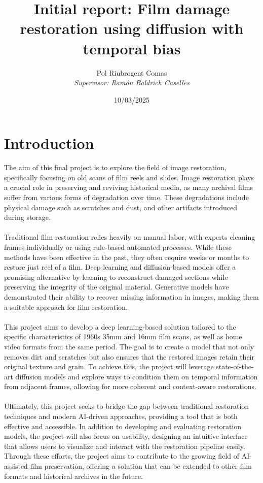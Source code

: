 \documentclass[openany, 12pt]{article}
\begin{document}
	\pagestyle{plain}
	\author{Pol Riubrogent Comas\\ \textit{Supervisor: Ramón Baldrich Caselles}}
	\title{\textbf{Initial report: Film damage restoration using diffusion with temporal bias}}
	\date{\small 10/03/2025}
	\maketitle
	\section{Introduction}
The aim of this final project is to explore the field of image restoration, specifically focusing on old scans of film reels and slides. Image restoration plays a crucial role in preserving and reviving historical media, as many archival films suffer from various forms of degradation over time. These degradations include physical damage such as scratches and dust, and other artifacts introduced during storage. \\\\
Traditional film restoration relies heavily on manual labor, with experts cleaning frames individually or using rule-based automated processes. While these methods have been effective in the past, they often require weeks or months to restore just reel of a film. Deep learning and diffusion-based models offer a promising alternative by learning to reconstruct damaged sections while preserving the integrity of the original material. Generative models have demonstrated their ability to recover missing information in images, making them a suitable approach for film restoration.\\\\
This project aims to develop a deep learning-based solution tailored to the specific characteristics of 1960s 35mm and 16mm film scans, as well as home video formats from the same period. The goal is to create a model that not only removes dirt and scratches but also ensures that the restored images retain their original texture and grain. To achieve this, the project will leverage state-of-the-art diffusion models and explore ways to condition them on temporal information from adjacent frames, allowing for more coherent and context-aware restorations.\\\\
Ultimately, this project seeks to bridge the gap between traditional restoration techniques and modern AI-driven approaches, providing a tool that is both effective and accessible. In addition to developing and evaluating restoration models, the project will also focus on usability, designing an intuitive interface that allows users to visualize and interact with the restoration pipeline easily. Through these efforts, the project aims to contribute to the growing field of AI-assisted film preservation, offering a solution that can be extended to other film formats and historical archives in the future.
\newpage
\end{document}
